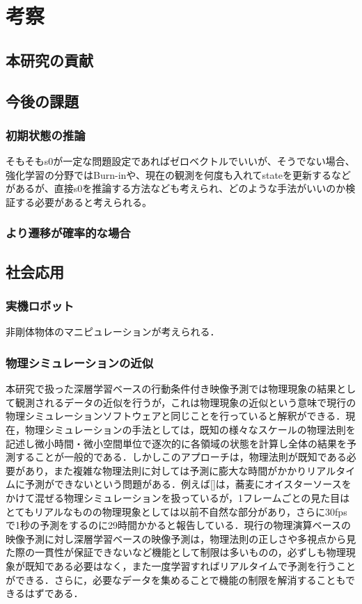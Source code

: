 \chapter{考察}
\label{chap:discussion}

\section{本研究の貢献}

\section{今後の課題}

\subsection{初期状態の推論}

そもそもs0が一定な問題設定であればゼロベクトルでいいが、そうでない場合、強化学習の分野ではBurn-inや、現在の観測を何度も入れてstateを更新するなどがあるが、直接s0を推論する方法なども考えられ、どのような手法がいいのか検証する必要があると考えられる。

\subsection{より遷移が確率的な場合}

\section{社会応用}

\subsection{実機ロボット}

非剛体物体のマニピュレーションが考えられる．


\subsection{物理シミュレーションの近似}
本研究で扱った深層学習ベースの行動条件付き映像予測では物理現象の結果として観測されるデータの近似を行うが，これは物理現象の近似という意味で現行の物理シミュレーションソフトウェアと同じことを行っていると解釈ができる．現在，物理シミュレーションの手法としては，既知の様々なスケールの物理法則を記述し微小時間・微小空間単位で逐次的に各領域の状態を計算し全体の結果を予測することが一般的である．しかしこのアプローチは，物理法則が既知である必要があり，また複雑な物理法則に対しては予測に膨大な時間がかかりリアルタイムに予測ができないという問題がある．例えば[]は，蕎麦にオイスターソースをかけて混ぜる物理シミュレーションを扱っているが，1フレームごとの見た目はとてもリアルなものの物理現象としては以前不自然な部分があり，さらに30fpsで1秒の予測をするのに29時間かかると報告している．現行の物理演算ベースの映像予測に対し深層学習ベースの映像予測は，物理法則の正しさや多視点から見た際の一貫性が保証できないなど機能として制限は多いものの，必ずしも物理現象が既知である必要はなく，また一度学習すればリアルタイムで予測を行うことができる．さらに，必要なデータを集めることで機能の制限を解消することもできるはずである．

